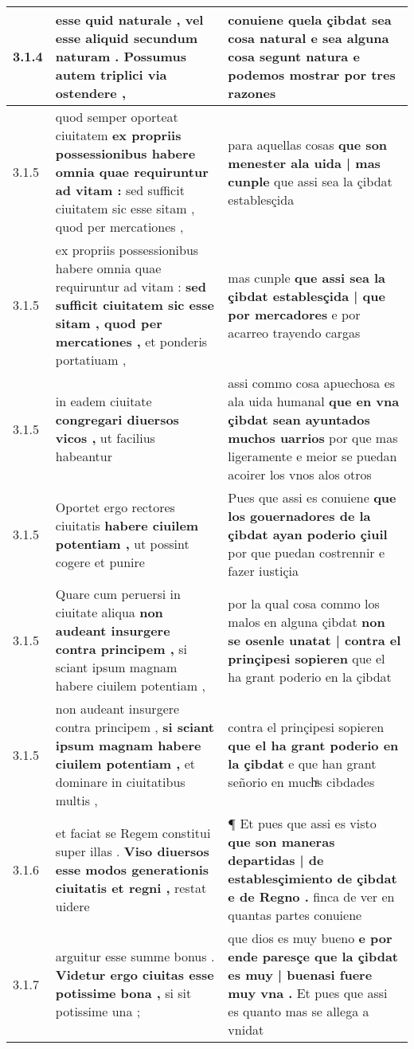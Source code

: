 \begin{tabular}{|p{1cm}|p{6.5cm}|p{6.5cm}|}
3.1.4 & esse quid naturale , \textbf{ vel esse aliquid secundum naturam . } Possumus autem triplici via ostendere , & conuiene quela çibdat sea cosa natural \textbf{ e sea alguna cosa segunt natura } e podemos mostrar por tres razones \\\hline
3.1.5 & quod semper oporteat ciuitatem \textbf{ ex propriis possessionibus habere omnia quae requiruntur ad vitam : } sed sufficit ciuitatem sic esse sitam , quod per mercationes , & para aquellas cosas \textbf{ que son menester ala uida | mas cunple } que assi sea la çibdat establesçida \\\hline
3.1.5 & ex propriis possessionibus habere omnia quae requiruntur ad vitam : \textbf{ sed sufficit ciuitatem sic esse sitam , quod per mercationes , } et ponderis portatiuam , & mas cunple \textbf{ que assi sea la çibdat establesçida | que por mercadores } e por acarreo trayendo cargas \\\hline
3.1.5 & in eadem ciuitate \textbf{ congregari diuersos vicos , } ut facilius habeantur & assi commo cosa apuechosa es ala uida humanal \textbf{ que en vna çibdat sean ayuntados muchos uarrios } por que mas ligeramente e meior se puedan acoirer los vnos alos otros \\\hline
3.1.5 & Oportet ergo rectores ciuitatis \textbf{ habere ciuilem potentiam , } ut possint cogere et punire & Pues que assi es conuiene \textbf{ que los gouernadores de la çibdat ayan poderio çiuil } por que puedan costrennir e fazer iustiçia \\\hline
3.1.5 & Quare cum peruersi in ciuitate aliqua \textbf{ non audeant insurgere contra principem , } si sciant ipsum magnam habere ciuilem potentiam , & por la qual cosa commo los malos en alguna çibdat \textbf{ non se osenle unatat | contra el prinçipesi sopieren } que el ha grant poderio en la çibdat \\\hline
3.1.5 & non audeant insurgere contra principem , \textbf{ si sciant ipsum magnam habere ciuilem potentiam , } et dominare in ciuitatibus multis , & contra el prinçipesi sopieren \textbf{ que el ha grant poderio en la çibdat } e que han grant señorio en muchͣs cibdades \\\hline
3.1.6 & et faciat se Regem constitui super illas . \textbf{ Viso diuersos esse modos generationis ciuitatis et regni , } restat uidere & ¶ Et pues que assi es visto \textbf{ que son maneras departidas | de establesçimiento de çibdat e de Regno . } finca de ver en quantas partes conuiene \\\hline
3.1.7 & arguitur esse summe bonus . \textbf{ Videtur ergo ciuitas esse potissime bona , } si sit potissime una ; & que dios es muy bueno \textbf{ e por ende paresçe que la çibdat es muy | buenasi fuere muy vna . } Et pues que assi es quanto mas se allega a vnidat \\\hline

\end{tabular}
